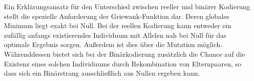 \documentclass[12pt,
    a4paper,
    headinclude,
    footinclude]{scrreprt}
\begin{document}
Ein Erklärungsansatz für den Unterschied zwischen reeller und binärer Kodierung stellt die spezielle Anforderung der Griewank-Funktion dar. Deren globales Minimum liegt exakt bei Null. Bei der reellen Kodierung kann entweder ein zufällig anfangs existierendes Individuum mit Allelen nah bei Null für das optimale Ergebnis sorgen. Außerdem ist dies über die Mutation möglich. 
Währenddessen bietet sich bei der Binärkodierung zusätzlich die Chance auf die Existenz eines solchen Individuums durch Rekombination von Elternpaaren, so dass sich ein Binärstrang ausschließlich aus Nullen ergeben kann.

	
	

	

	
	

	

	


	

	
	
	



	
	
	
	
	
\end{document}
